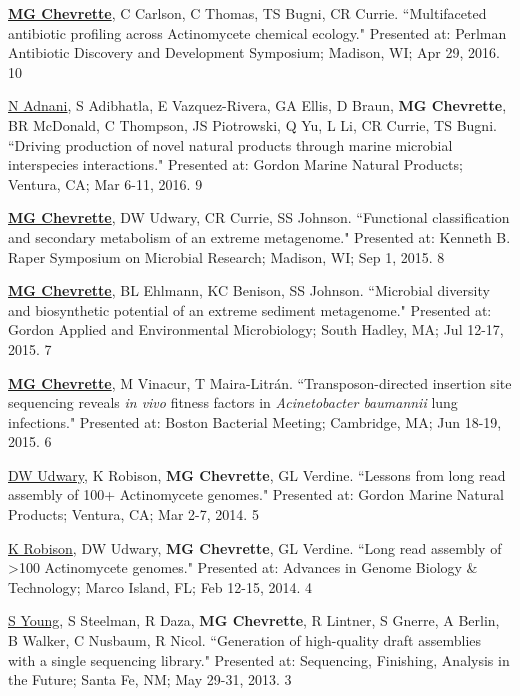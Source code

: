 \begin{cvpubs}
\cvpub
{\textbf{\underline{MG Chevrette}}, C Carlson, C Thomas, TS Bugni, CR Currie. ``Multifaceted antibiotic profiling across Actinomycete chemical ecology." Presented at: Perlman Antibiotic Discovery and Development Symposium; Madison, WI; Apr 29, 2016.}
{10}

\cvpub
{\underline{N Adnani}, S Adibhatla, E Vazquez-Rivera, GA Ellis, D Braun, \textbf{MG Chevrette}, BR McDonald, C Thompson, JS Piotrowski, Q Yu, L Li, CR Currie, TS Bugni. ``Driving production of novel natural products through marine microbial interspecies interactions." Presented at: Gordon Marine Natural Products; Ventura, CA; Mar 6-11, 2016.}
{9}

\cvpub
{\textbf{\underline{MG Chevrette}}, DW Udwary, CR Currie, SS Johnson. ``Functional classification and secondary metabolism of an extreme metagenome." Presented at: Kenneth B. Raper Symposium on Microbial Research; Madison, WI; Sep 1, 2015.}
{8}

\end{cvpubs} \begin{cvpubs}

\cvpub
{\textbf{\underline{MG Chevrette}}, BL Ehlmann, KC Benison, SS Johnson. ``Microbial diversity and biosynthetic potential of an extreme sediment metagenome." Presented at: Gordon Applied and Environmental Microbiology; South Hadley, MA; Jul 12-17, 2015.}
{7}

\cvpub
{\textbf{\underline{MG Chevrette}}, M Vinacur, T Maira-Litr\'{a}n. ``Transposon-directed insertion site sequencing reveals \textit{in vivo} fitness factors in \textit{Acinetobacter baumannii} lung infections." Presented at: Boston Bacterial Meeting; Cambridge, MA; Jun 18-19, 2015.}
{6}

\cvpub
{\underline{DW Udwary}, K Robison, \textbf{MG Chevrette}, GL Verdine. ``Lessons from long read assembly of 100+ Actinomycete genomes." Presented at: Gordon Marine Natural Products; Ventura, CA; Mar 2-7, 2014.}
{5}

\cvpub
{\underline{K Robison}, DW Udwary, \textbf{MG Chevrette}, GL Verdine. ``Long read assembly of >100 Actinomycete genomes." Presented at: Advances in Genome Biology \& Technology; Marco Island, FL; Feb 12-15, 2014.}
{4}

\cvpub
{\underline{S Young}, S Steelman, R Daza, \textbf{MG Chevrette}, R Lintner, S Gnerre, A Berlin, B Walker, C Nusbaum, R Nicol. ``Generation of high-quality draft assemblies with a single sequencing library." Presented at: Sequencing, Finishing, Analysis in the Future; Santa Fe, NM; May 29-31, 2013.}
{3}


\end{cvpubs}
